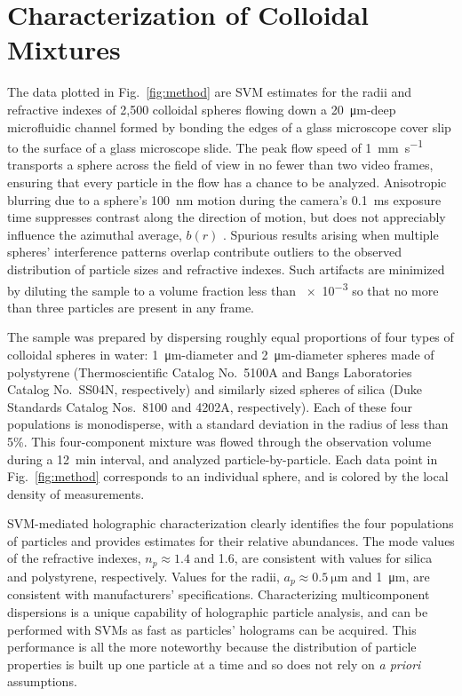 \section{Characterization of Colloidal Mixtures}

The data plotted in Fig.~\ref{fig:method} are
SVM estimates for the radii and refractive indexes of 2,500 
colloidal spheres flowing down a \SI{20}{\um}-deep 
microfluidic channel formed by bonding
the edges of a glass microscope cover slip to the surface of a
glass microscope slide.
The peak flow speed of 
\SI{1}{\mm\per\second} transports  
a sphere across the field of view in no fewer than  
two video frames, ensuring that every particle in the  
flow has a chance to be analyzed.  
Anisotropic blurring due to a sphere's \SI{100}{\nm} 
motion during the camera's \SI{0.1}{\ms} exposure time  
suppresses contrast along the direction of motion, but does not  
appreciably influence the azimuthal average, $b(r)$ \cite{dixon11}.  
Spurious results arising when 
multiple spheres' interference patterns overlap
contribute outliers to the observed
distribution of particle sizes and refractive indexes.
Such artifacts are minimized by diluting the sample to a volume
fraction less than \num{e-3} so that 
no more than three particles are present in any frame.

The sample was prepared by dispersing roughly equal proportions 
of four types of colloidal spheres in water:
\SI{1}{\um}-diameter and \SI{2}{\um}-diameter 
spheres made of polystyrene (Thermoscientific Catalog No.\ 5100A and 
Bangs Laboratories Catalog No.\ SS04N, respectively) and similarly
sized spheres of silica (Duke
Standards Catalog Nos.\ 8100 and 4202A, respectively).
Each of these four populations is monodisperse, with a
standard deviation in the radius of less than 5\%.
This four-component mixture was 
flowed through the
observation volume during a \SI{12}{\minute} interval,
and analyzed particle-by-particle.
Each data point in Fig.~\ref{fig:method} corresponds to an individual 
sphere, and is colored by the local density of measurements.

SVM-mediated holographic characterization clearly identifies
the four populations of particles and provides estimates for their relative abundances.
The mode values of the refractive indexes, $n_p \approx \num{1.4}$ 
and \num{1.6}, are consistent with values for silica and polystyrene,
respectively.  Values for the radii, $a_p \approx \SI{0.5}{\um}$
and \SI{1}{\um}, are consistent with manufacturers'
specifications.
Characterizing multicomponent dispersions
is a unique capability of holographic particle analysis, and
can be performed with SVMs as fast as 
particles' holograms can be acquired.
This performance is all the more noteworthy because the
distribution of particle properties is built up one particle at a time
and so does not rely on \emph{a priori} assumptions.

